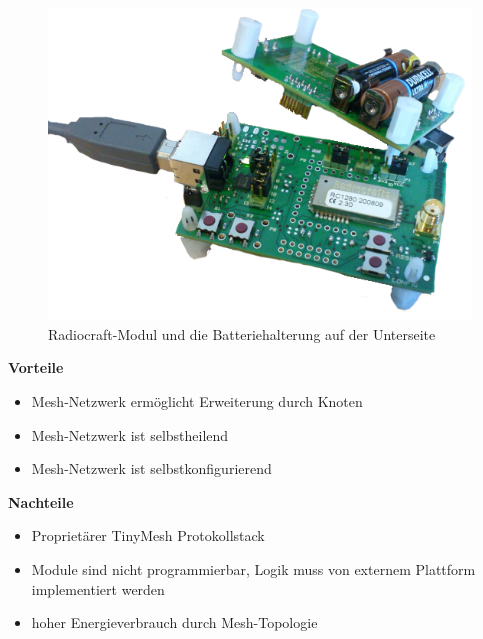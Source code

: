 \begin{figure}[H]
     \centering
        \includegraphics[scale=0.5]{pictures/TinyMesh.png}
    \caption{Radiocraft-Modul und die Batteriehalterung auf der Unterseite}
    \label{fig:TinyMesh}
\end{figure}

\textbf{Vorteile}
\begin{itemize}
\item Mesh-Netzwerk ermöglicht Erweiterung durch Knoten
\item Mesh-Netzwerk ist selbstheilend
\item Mesh-Netzwerk ist selbstkonfigurierend
\end{itemize}
\textbf{Nachteile}
\begin{itemize}
\item Proprietärer TinyMesh Protokollstack
\item Module sind nicht programmierbar, Logik muss von externem Plattform implementiert werden
\item hoher Energieverbrauch durch Mesh-Topologie
\end{itemize}

\newpage

